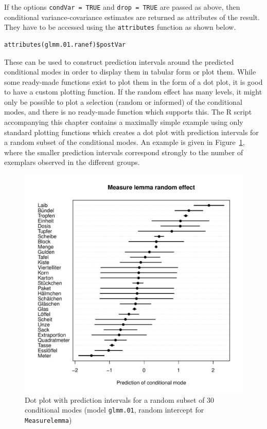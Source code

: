 If the options \texttt{condVar = TRUE} and \texttt{drop = TRUE} are passed as above, then conditional variance-covariance estimates are returned as attributes of the result.
They have to be accessed using the \texttt{attributes} function as shown below.

\vspace{0.5\baselineskip}

\begin{lstlisting}
attributes(glmm.01.ranef)$postVar
\end{lstlisting}

These can be used to construct prediction intervals around the predicted conditional modes in order to display them in tabular form or plot them.
While some ready-made functions exist to plot them in the form of a dot plot, it is good to have a custom plotting function.
If the random effect has many levels, it might only be possible to plot a selection (random or informed) of the conditional modes, and there is no ready-made function which supports this.
The R script accompanying this chapter contains a maximally simple example using only standard plotting functions which creates a dot plot with prediction intervals for a random subset of the conditional modes.
An example is given in Figure~\ref{fig:condmodes}, where the smaller prediction intervals correspond strongly to the number of exemplars observed in the different groups.

\begin{figure}
  \centering
  \includegraphics[width=\textwidth]{RPHCL/ranef_selection}
  \caption{Dot plot with prediction intervals for a random subset of 30 conditional modes (model \texttt{glmm.01}, random intercept for \texttt{Measurelemma})}
  \label{fig:condmodes}
\end{figure}

